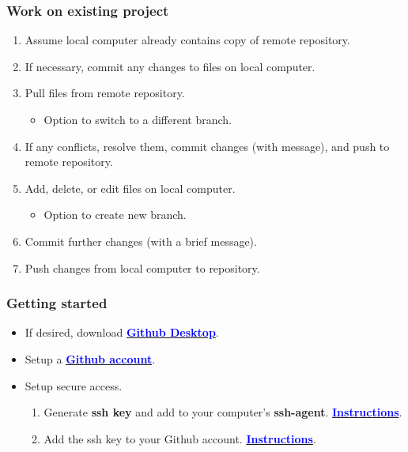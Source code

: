 \documentclass{beamer}
\begin{document}
\begin{frame}
\frametitle{Work on existing project}
\begin{enumerate}
\item Assume local computer already contains copy of remote repository.
\item If necessary, commit any changes to files on local computer.
\item Pull files from remote repository.
\begin{itemize}
\item Option to switch to a different branch.
\end{itemize}
\item If any conflicts, resolve them, commit changes (with message), and push to remote repository.
\item Add, delete, or edit files on local computer.
\begin{itemize}
\item Option to create new branch.
\end{itemize}
\item Commit further changes (with a brief message).
\item Push changes from local computer to repository. 
\end{enumerate}
\end{frame}

\begin{frame}
\frametitle{Getting started}
\begin{itemize}
\item If desired, download
\href{https://desktop.github.com}{\textcolor{blue}{\textbf{Github Desktop}}}.
\item Setup a \href{https://github.com}{\textcolor{blue}{\textbf{Github account}}}.
\item Setup secure access.
\begin{enumerate}
\item Generate \textbf{ssh key} and add to your computer's \textbf{ssh-agent}. 
\href{https://docs.github.com/en/authentication/connecting-to-github-with-ssh/generating-a-new-ssh-key-and-adding-it-to-the-ssh-agent}{\textcolor{blue}{\textbf{Instructions}}}.
\item Add the ssh key to your Github account. 
\href{https://docs.github.com/en/authentication/connecting-to-github-with-ssh/adding-a-new-ssh-key-to-your-github-account}{\textcolor{blue}{\textbf{Instructions}}}.
\end{enumerate}
\end{itemize}
\end{frame}
\end{document}
